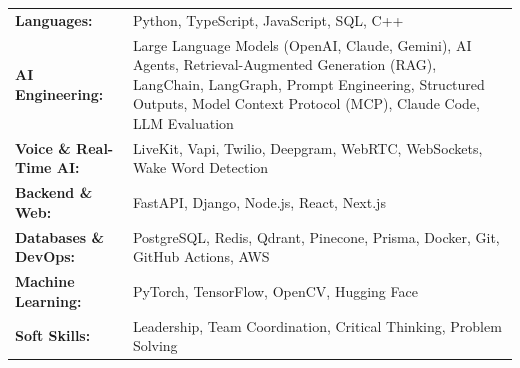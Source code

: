 \begin{tabularx}{\textwidth}{l@{\hspace{0.5cm}} X}
  \textbf{Languages:} & Python, TypeScript, JavaScript, SQL, C++ \\
  \textbf{AI Engineering:} & Large Language Models (OpenAI, Claude, Gemini), AI Agents, Retrieval-Augmented Generation (RAG), LangChain, LangGraph, Prompt Engineering, Structured Outputs, Model Context Protocol (MCP), Claude Code, LLM Evaluation \\
  \textbf{Voice \& Real-Time AI:} & LiveKit, Vapi, Twilio, Deepgram, WebRTC, WebSockets, Wake Word Detection \\
  \textbf{Backend \& Web:} & FastAPI, Django, Node.js, React, Next.js \\
  \textbf{Databases \& DevOps:} & PostgreSQL, Redis, Qdrant, Pinecone, Prisma, Docker, Git, GitHub Actions, AWS \\
  \textbf{Machine Learning:} & PyTorch, TensorFlow, OpenCV, Hugging Face \\
  \textbf{Soft Skills:} & Leadership, Team Coordination, Critical Thinking, Problem Solving \\
\end{tabularx}
